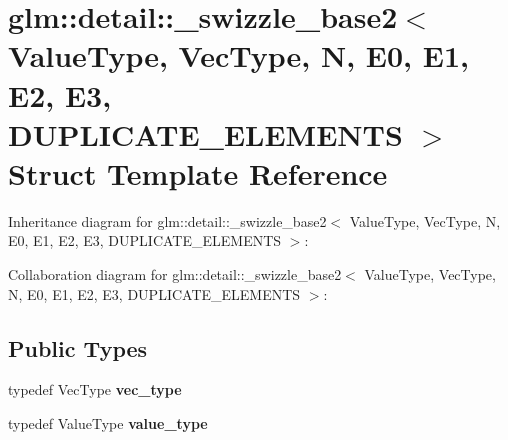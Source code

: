 \hypertarget{structglm_1_1detail_1_1__swizzle__base2}{}\section{glm\+:\+:detail\+:\+:\+\_\+swizzle\+\_\+base2$<$ Value\+Type, Vec\+Type, N, E0, E1, E2, E3, D\+U\+P\+L\+I\+C\+A\+T\+E\+\_\+\+E\+L\+E\+M\+E\+N\+T\+S $>$ Struct Template Reference}
\label{structglm_1_1detail_1_1__swizzle__base2}


Inheritance diagram for glm\+:\+:detail\+:\+:\+\_\+swizzle\+\_\+base2$<$ Value\+Type, Vec\+Type, N, E0, E1, E2, E3, D\+U\+P\+L\+I\+C\+A\+T\+E\+\_\+\+E\+L\+E\+M\+E\+N\+T\+S $>$\+:


Collaboration diagram for glm\+:\+:detail\+:\+:\+\_\+swizzle\+\_\+base2$<$ Value\+Type, Vec\+Type, N, E0, E1, E2, E3, D\+U\+P\+L\+I\+C\+A\+T\+E\+\_\+\+E\+L\+E\+M\+E\+N\+T\+S $>$\+:
\subsection*{Public Types}
\begin{DoxyCompactItemize}
\item 
\hypertarget{structglm_1_1detail_1_1__swizzle__base2_afad8673697b2a4bcbd1de30e49cc2a54}{}typedef Vec\+Type {\bfseries vec\+\_\+type}\label{structglm_1_1detail_1_1__swizzle__base2_afad8673697b2a4bcbd1de30e49cc2a54}

\item 
\hypertarget{structglm_1_1detail_1_1__swizzle__base2_a2b683ea47a63ff7d00943cd55b7c0b02}{}typedef Value\+Type {\bfseries value\+\_\+type}\label{structglm_1_1detail_1_1__swizzle__base2_a2b683ea47a63ff7d00943cd55b7c0b02}

\end{DoxyCompactItemize}
